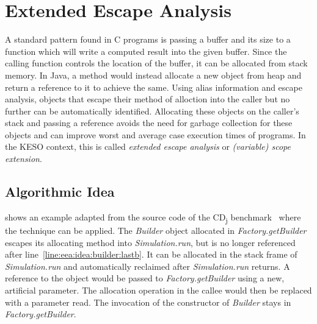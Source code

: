 
\chapter{Extended Escape Analysis}
	\label{chapter:eea}
	A standard pattern found in C programs is passing a buffer and its size to a function which will write a computed
	result into the given buffer. Since the calling function controls the location of the buffer, it can be allocated from
	stack memory. In Java, a method would instead allocate a new object from heap and return a reference to it to achieve
	the same. Using alias information and escape analysis, objects that escape their method of alloction into the caller
	but no further can be automatically identified. Allocating these objects on the caller's stack and passing a reference
	avoids the need for garbage collection for these objects and can improve worst and average case execution times of
	programs. In the KESO context, this is called \emph{extended escape analysis} or \emph{(variable) scope extension}.

	\section{Algorithmic Idea}
		\label{sec:eea:idea}
		 shows an example adapted from the source code of the CD\textsubscript{j}
		benchmark~\cite{kalibera:09:jtres} where the technique can be applied. The \emph{Builder} object allocated in
		\emph{Factory.getBuilder} escapes its allocating method into \emph{Simulation.run}, but is no longer referenced
		after line~\ref{line:eea:idea:builder:lastb}. It can be allocated in the stack frame of \emph{Simulation.run} and
		automatically reclaimed after \emph{Simulation.run} returns. A reference to the object would be passed to
		\emph{Factory.getBuilder} using a new, artificial parameter. The allocation operation in the callee would then be
		replaced with a parameter read. The invocation of the constructor of \emph{Builder} stays in
		\emph{Factory.getBuilder}.

